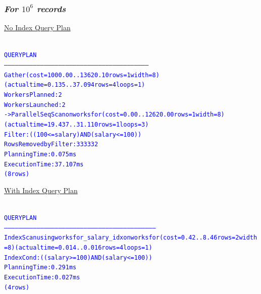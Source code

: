 \documentclass{article}
\begin{document}
    \subsubsection*{\emph{For $10^6$ records}}
    \underline{No Index Query Plan}
    \begin{center}
      {\tiny
      \begin{alltt}
      \textcolor{blue}{
        QUERY PLAN                                                       
        -----------------------------------------------------------------------------------------------------------------------
         Gather  (cost=1000.00..13620.10 rows=1 width=8) (actual time=0.135..37.094 rows=4 loops=1)
           Workers Planned: 2
           Workers Launched: 2
           ->  Parallel Seq Scan on worksfor  (cost=0.00..12620.00 rows=1 width=8) (actual time=19.437..31.110 rows=1 loops=3)
                 Filter: ((100 <= salary) AND (salary <= 100))
                 Rows Removed by Filter: 333332
         Planning Time: 0.075 ms
         Execution Time: 37.107 ms
        (8 rows)
       }
      \end{alltt}
      }
    \end{center}
    \underline{With Index Query Plan}
    \begin{center}
      {\tiny
      \begin{alltt}
      \textcolor{blue}{
        QUERY PLAN                                                          
        ------------------------------------------------------------------------------------------------------------------------------
         Index Scan using worksfor_salary_idx on worksfor  (cost=0.42..8.46 rows=2 width=8) (actual time=0.014..0.016 rows=4 loops=1)
           Index Cond: ((salary >= 100) AND (salary <= 100))
         Planning Time: 0.291 ms
         Execution Time: 0.027 ms
        (4 rows)
       }
      \end{alltt}
      }
    \end{center}
\end{document}
